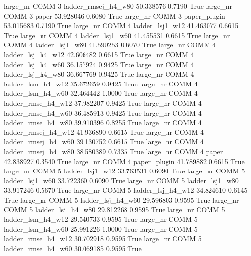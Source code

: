   large_nr     COMM                 3 ladder_rmsej_h4_w80   50.338576      0.7190    True
  large_nr     COMM                 3               paper   53.928046      0.6080    True
  large_nr     COMM                 3        paper_plugin   53.015683      0.7190    True
  large_nr     COMM                 4     ladder_lsj1_w12   41.463077      0.6615    True
  large_nr     COMM                 4     ladder_lsj1_w60   41.455531      0.6615    True
  large_nr     COMM                 4     ladder_lsj1_w80   41.590253      0.6070    True
  large_nr     COMM                 4   ladder_lsj_h4_w12   42.606482      0.6615    True
  large_nr     COMM                 4   ladder_lsj_h4_w60   36.157924      0.9425    True
  large_nr     COMM                 4   ladder_lsj_h4_w80   36.667769      0.9425    True
  large_nr     COMM                 4   ladder_lsm_h4_w12   35.672659      0.9425    True
  large_nr     COMM                 4   ladder_lsm_h4_w60   32.464442      1.0000    True
  large_nr     COMM                 4  ladder_rmse_h4_w12   37.982207      0.9425    True
  large_nr     COMM                 4  ladder_rmse_h4_w60   36.485913      0.9425    True
  large_nr     COMM                 4  ladder_rmse_h4_w80   39.910396      0.8255    True
  large_nr     COMM                 4 ladder_rmsej_h4_w12   41.936890      0.6615    True
  large_nr     COMM                 4 ladder_rmsej_h4_w60   39.130752      0.6615    True
  large_nr     COMM                 4 ladder_rmsej_h4_w80   38.580389      0.7335    True
  large_nr     COMM                 4               paper   42.838927      0.3540    True
  large_nr     COMM                 4        paper_plugin   41.789882      0.6615    True
  large_nr     COMM                 5     ladder_lsj1_w12   33.763531      0.6090    True
  large_nr     COMM                 5     ladder_lsj1_w60   33.722360      0.6090    True
  large_nr     COMM                 5     ladder_lsj1_w80   33.917246      0.5670    True
  large_nr     COMM                 5   ladder_lsj_h4_w12   34.824610      0.6145    True
  large_nr     COMM                 5   ladder_lsj_h4_w60   29.596803      0.9595    True
  large_nr     COMM                 5   ladder_lsj_h4_w80   29.812268      0.9595    True
  large_nr     COMM                 5   ladder_lsm_h4_w12   29.540733      0.9595    True
  large_nr     COMM                 5   ladder_lsm_h4_w60   25.991226      1.0000    True
  large_nr     COMM                 5  ladder_rmse_h4_w12   30.702918      0.9595    True
  large_nr     COMM                 5  ladder_rmse_h4_w60   30.069185      0.9595    True
